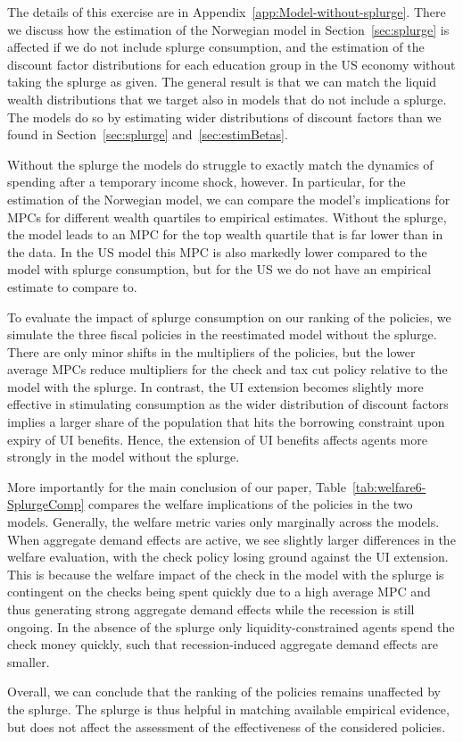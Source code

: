 \documentclass{econsocart}
\begin{document}
The details of this exercise are in Appendix~\ref{app:Model-without-splurge}.
There we discuss how the estimation of the Norwegian model in Section~\ref{sec:splurge} is affected if we do not include splurge consumption, and the estimation of the discount factor distributions for each education group in the US economy without taking the splurge as given.
The general result is that we can match the liquid wealth distributions that we target also in models that do not include a splurge.
The models do so by estimating wider distributions of discount factors than we found in Section~\ref{sec:splurge} and~\ref{sec:estimBetas}.

Without the splurge the models do struggle to exactly match the dynamics of spending after a temporary income shock, however.
In particular, for the estimation of the Norwegian model, we can compare the model's implications for MPCs for different wealth quartiles to empirical estimates.
Without the splurge, the model leads to an MPC for the top wealth quartile that is far lower than in the data.
In the US model this MPC is also markedly lower compared to the model with splurge consumption, but for the US we do not have an empirical estimate to compare to.

To evaluate the impact of splurge consumption on our ranking of the policies, we simulate the three fiscal policies in the reestimated model without the splurge.
There are only minor shifts in the multipliers of the policies, but the lower average MPCs reduce multipliers for the check and tax cut policy relative to the model with the splurge.
In contrast, the UI extension becomes slightly more effective in stimulating consumption as the wider distribution of discount factors implies a larger share of the population that hits the borrowing constraint upon expiry of UI benefits.
Hence, the extension of UI benefits affects agents more strongly in the model without the splurge.

More importantly for the main conclusion of our paper, Table~\ref{tab:welfare6-SplurgeComp} compares the welfare implications of the policies in the two models.
Generally, the welfare metric varies only marginally across the models.
When aggregate demand effects are active, we see slightly larger differences in the welfare evaluation, with the check policy losing ground against the UI extension.
This is because the welfare impact of the check in the model with the splurge is contingent on the checks being spent quickly due to a high average MPC and thus generating strong aggregate demand effects while the recession is still ongoing.
In the absence of the splurge only liquidity-constrained agents spend the check money quickly, such that recession-induced aggregate demand effects are smaller.



Overall, we can conclude that the ranking of the policies remains unaffected by the splurge.
The splurge is thus helpful in matching available empirical evidence, but does not affect the assessment of the effectiveness of the considered policies.

\smartbib
\end{document}
